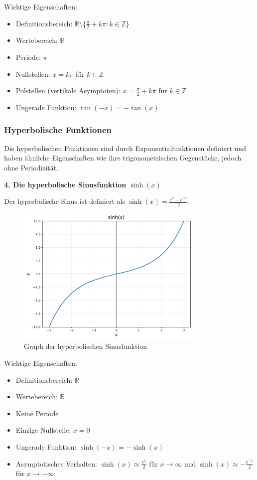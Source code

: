 \documentclass{article}
\begin{document}
Wichtige Eigenschaften:
\begin{itemize}
\item Definitionsbereich: $\mathbb{R} \setminus \{\frac{\pi}{2} + k\pi : k \in \mathbb{Z}\}$
\item Wertebereich: $\mathbb{R}$
\item Periode: $\pi$
\item Nullstellen: $x = k\pi$ für $k \in \mathbb{Z}$
\item Polstellen (vertikale Asymptoten): $x = \frac{\pi}{2} + k\pi$ für $k \in \mathbb{Z}$
\item Ungerade Funktion: $\tan(-x) = -\tan(x)$
\end{itemize}

\subsubsection*{Hyperbolische Funktionen}

Die hyperbolischen Funktionen sind durch Exponentialfunktionen definiert und haben ähnliche Eigenschaften wie ihre trigonometrischen Gegenstücke, jedoch ohne Periodizität.

\textbf{4. Die hyperbolische Sinusfunktion $\sinh(x)$}

Der hyperbolische Sinus ist definiert als $\sinh(x) = \frac{e^x - e^{-x}}{2}$.

\begin{figure}[!htbp]
\centering
\includegraphics[width=0.8\textwidth]{sinh.pdf}
\caption{Graph der hyperbolischen Sinusfunktion}
\end{figure}

Wichtige Eigenschaften:
\begin{itemize}
\item Definitionsbereich: $\mathbb{R}$
\item Wertebereich: $\mathbb{R}$
\item Keine Periode
\item Einzige Nullstelle: $x = 0$
\item Ungerade Funktion: $\sinh(-x) = -\sinh(x)$
\item Asymptotisches Verhalten: $\sinh(x) \approx \frac{e^x}{2}$ für $x \to \infty$ und $\sinh(x) \approx -\frac{e^{-x}}{2}$ für $x \to -\infty$
\end{itemize}
\end{document}
